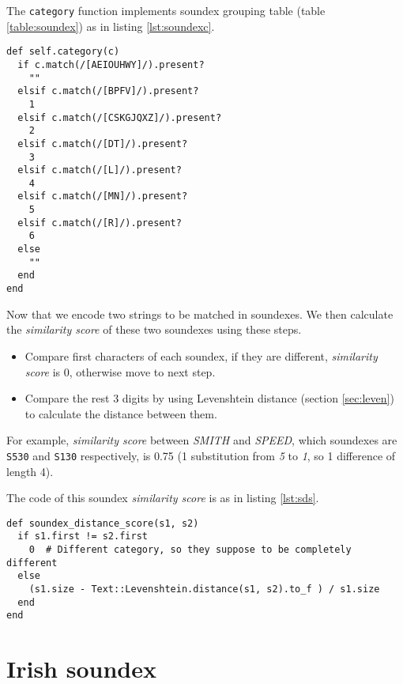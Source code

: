 The \texttt{category} function implements soundex grouping table (table \ref{table:soundex})
as in listing \ref{lst:soundexc}.

\begin{minipage}{\linewidth}
\begin{lstlisting}[label={lst:soundexc}, caption={Soundex grouping table implementation.}]
def self.category(c)
  if c.match(/[AEIOUHWY]/).present?
    ""
  elsif c.match(/[BPFV]/).present?
    1
  elsif c.match(/[CSKGJQXZ]/).present?
    2
  elsif c.match(/[DT]/).present?
    3
  elsif c.match(/[L]/).present?
    4
  elsif c.match(/[MN]/).present?
    5
  elsif c.match(/[R]/).present?
    6
  else
    ""
  end
end
\end{lstlisting}
\end{minipage}

Now that we encode two strings to be matched in soundexes.
We then calculate the \emph{similarity score} of these two soundexes using
these steps.

\begin{itemize}
  \item Compare first characters of each soundex, if they are different,
    \emph{similarity score} is 0, otherwise move to next step.
  \item Compare the rest 3 digits by using Levenshtein distance (section \ref{sec:leven})
    to calculate the distance between them.
\end{itemize}

For example, \emph{similarity score} between \emph{SMITH} and \emph{SPEED},
which soundexes are \texttt{S530} and \texttt{S130} respectively,
is 0.75 (1 substitution from \emph{5} to \emph{1}, so 1 difference of length 4).

The code of this soundex \emph{similarity score} is as in listing \ref{lst:sds}.

\begin{minipage}{\linewidth}
  \begin{lstlisting}[label={lst:sds}, caption={Soundex similarity score implementation.}]
def soundex_distance_score(s1, s2)
  if s1.first != s2.first
    0  # Different category, so they suppose to be completely different
  else
    (s1.size - Text::Levenshtein.distance(s1, s2).to_f ) / s1.size
  end
end
\end{lstlisting}
\end{minipage}

\section{Irish soundex}


